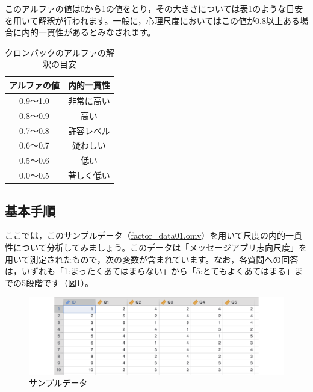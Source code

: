 \documentclass[
  12pt,
  a5jpaper,
  lualatex, ja=standard]{bxjsbook}
\begin{document}
このアルファの値は0から1の値をとり，その大きさについては表\ref{tab:factor-cronbach-alpha}のような目安を用いて解釈が行われます。一般に，心理尺度においてはこの値が0.8以上ある場合に内的一貫性があるとみなされます。

\begin{table}[H]

\caption{\label{tab:factor-cronbach-alpha}クロンバックのアルファの解釈の目安}
\centering
\begin{tabular}[t]{cc}
\toprule
アルファの値 & 内的一貫性\\
\midrule
0.9〜1.0 & 非常に高い\\
0.8〜0.9 & 高い\\
0.7〜0.8 & 許容レベル\\
0.6〜0.7 & 疑わしい\\
0.5〜0.6 & 低い\\
0.0〜0.5 & 著しく低い\\
\bottomrule
\end{tabular}
\end{table}

\hypertarget{sub:factor-reliability-analysis-method}{%
\subsection{基本手順}\label{sub:factor-reliability-analysis-method}}

ここでは，このサンプルデータ（\href{https://github.com/sbtseiji/jmv_compguide/raw/main/data/omv/factor_data01.omv}{factor\_data01.omv}）を用いて尺度の内的一貫性について分析してみましょう。このデータは「メッセージアプリ志向尺度」を用いて測定されたもので，次の変数が含まれています。なお，各質問への回答は，いずれも「1:まったくあてはまらない」から「5:とてもよくあてはまる」までの5段階です（図\ref{fig:factor-data01}）。

\begin{figure}[!ht]

{\centering \includegraphics[width=1\linewidth]{images/factor/data01} 

}

\caption{サンプルデータ}\label{fig:factor-data01}
\end{figure}
\end{document}
